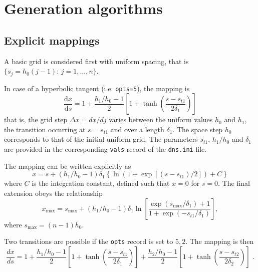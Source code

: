 \section{Generation algorithms}

\subsection{Explicit mappings}
A basic grid is considered first with uniform spacing, that is
$\{s_j=h_0(j-1):\, j = 1,\ldots,n\}$. 

In case of a hyperbolic tangent (i.e. {\tt opts=5}), the mapping is
\begin{equation}
\frac{\mathrm{d}x}{\mathrm{d}s} = 1 + \frac{h_1/h_0-1}{2}\left[ 1 + \tanh\left(\frac{s-s_{t1}}{2\delta_1}\right)\right]
\end{equation}
that is, the grid step $\Delta x =dx/dj$ varies between the uniform values $h_0$
and $h_1$, the transition occurring at $s=s_{t1}$ and over a length $\delta_1$. The
space step $h_0$ corresponds to that of the initial uniform grid. The parameters
$s_{t1}$, $h_1/h_0$ and $\delta_1$ are provided in the corresponding {\tt vals}
record of the {\tt dns.ini} file.

The mapping can be written explicitly as
\begin{equation}
  x = s + (h_1/h_0-1)\delta_1\left\{\ln(1+\exp[(s-s_{t1})/2])+C\right\}
\end{equation}
where $C$ is the integration constant, defined such that $x=0$ for $s=0$. The final extension obeys the relationship
\begin{equation}
  x_\mathrm{max}=s_\mathrm{max} + (h_1/h_0-1)\delta_1\ln\left[\frac{\exp(s_\mathrm{max}/\delta_1)+1}{1+\exp(-s_{t1}/\delta_1)}\right],
\end{equation}
where $s_\mathrm{max} =(n-1)h_0$.

Two transitions are possible if the {\tt opts} record is set to $5,2$. The
mapping is then
\begin{equation}
\frac{dx}{ds} = 1 
+ \frac{h_1/h_0-1}{2}\left[ 1 + \tanh\left(\frac{s-s_{t1}}{2\delta_1}\right)\right]
+ \frac{h_2/h_0-1}{2}\left[ 1 + \tanh\left(\frac{s-s_{t2}}{2\delta_2}\right)\right]\;.
\end{equation}

